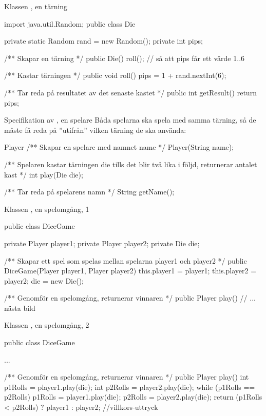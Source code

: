 \documentclass{lecturenotes}
\begin{document}
\begin{Slide}
{Klassen , en tärning}
\begin{Code}
import java.util.Random;
public class Die {
    private static Random rand = new Random();
    private int pips;

    /** Skapar en tärning */
    public Die() {
        roll(); // så att pips får ett värde 1..6
    }
    
    /** Kastar tärningen */
    public void roll() {
        pips = 1 + rand.nextInt(6);
    }
    
    /** Tar reda på resultatet av det senaste kastet */
    public int getResult() {
        return pips;
    }
}
\end{Code}
\end{Slide} 

\begin{Slide}
{Specifikation av , en spelare}
Båda spelarna ska spela med samma tärning, så de måste få reda på ''utifrån'' vilken tärning de ska använda:

\begin{ClassSpec}{Player}
/** Skapar en spelare med namnet name */
Player(String name);

/** Spelaren kastar tärningen die tills det blir 
    två lika i följd, returnerar antalet kast */
int play(Die die);

/** Tar reda på spelarens namn */
String getName();
\end{ClassSpec}
\end{Slide} 

\begin{Slide}
{Klassen , en spelomgång, 1}
\begin{Code}
public class DiceGame {
    private Player player1;
    private Player player2;
    private Die die;
    
    /** Skapar ett spel som spelas mellan spelarna
        player1 och player2 */
    public DiceGame(Player player1, Player player2) {
        this.player1 = player1;
        this.player2 = player2;
        die = new Die();
    }
    
    /** Genomför en spelomgång, returnerar vinnaren */
    public Player play() {
        // ... nästa bild
    }
}
\end{Code}
\end{Slide} 

\begin{Slide}
{Klassen , en spelomgång, 2}
\begin{Code}
public class DiceGame {
    ...
    
    /** Genomför en spelomgång, returnerar vinnaren */
    public Player play() {
        int p1Rolls = player1.play(die);
        int p2Rolls = player2.play(die);
        while (p1Rolls == p2Rolls) {
            p1Rolls = player1.play(die);
            p2Rolls = player2.play(die);
        }
        return (p1Rolls < p2Rolls) ? player1 : player2;  //villkors-uttryck
    }
}
\end{Code}
\end{Slide} 
\end{document}
